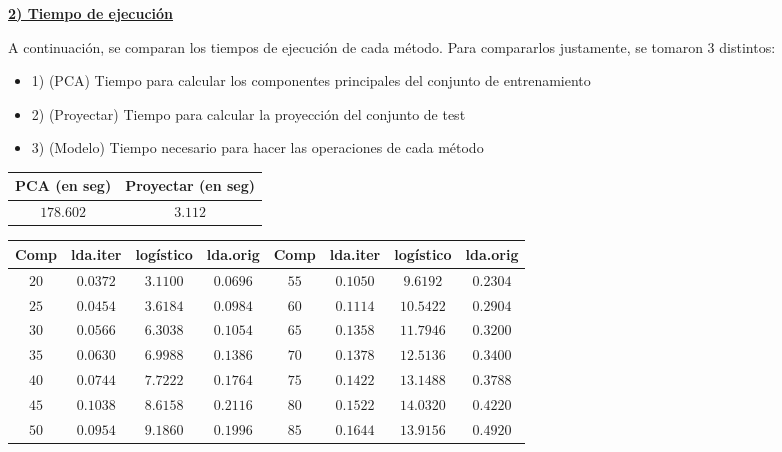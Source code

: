 \pagebreak

\underline{\textbf{2) Tiempo de ejecución}}

A continuación, se comparan los tiempos de ejecución de cada método. Para compararlos justamente, se tomaron 3 distintos:

\begin{itemize}
\item 1) (PCA) Tiempo para calcular los componentes principales del conjunto de entrenamiento
\item 2) (Proyectar) Tiempo para calcular la proyección del conjunto de test
\item 3) (Modelo) Tiempo necesario para hacer las operaciones de cada método

\end{itemize}

\begin{center}
\begin{tabular}{ | c | c |} 
\hline
 PCA (en seg) & Proyectar (en seg)\\ 
\hline
\hline
$178.602$ & $3.112$ \\ 
\hline
\hline
\end{tabular}
\end{center}

\begin{center}
\begin{tabular}{ | c | c | c | c | c | c | c | c |} 
\hline
Comp & lda.iter & logístico & lda.orig   & Comp & lda.iter & logístico & lda.orig   \\ 
\hline
\hline
$20$ & $0.0372$ & $3.1100$ & $0.0696$ & $55$ & $0.1050$ & $9.6192$ & $0.2304$ \\
$25$ & $0.0454$ & $3.6184$ & $0.0984$ & $60$ & $0.1114$ & $10.5422$ & $0.2904$ \\
$30$ & $0.0566$ & $6.3038$ & $0.1054$ & $65$ & $0.1358$ & $11.7946$ & $0.3200$ \\
$35$ & $0.0630$ & $6.9988$ & $0.1386$ & $70$ & $0.1378$ & $12.5136$ & $0.3400$ \\
$40$ & $0.0744$ & $7.7222$ & $0.1764$ & $75$ & $0.1422$ & $13.1488$ & $0.3788$ \\
$45$ & $0.1038$ & $8.6158$ & $0.2116$ & $80$ & $0.1522$ & $14.0320$ & $0.4220$ \\
$50$ & $0.0954$ & $9.1860$ & $0.1996$ & $85$ & $0.1644$ & $13.9156$ & $0.4920$ \\
\hline
\hline
\end{tabular}
\end{center}

